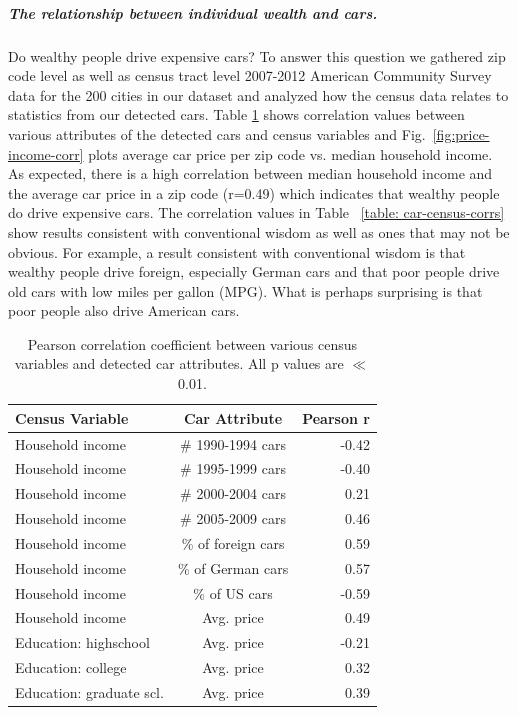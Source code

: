\documentclass[10pt,twocolumn,letterpaper]{article}
\begin{document}
\subparagraph{The relationship between individual wealth and cars.}
Do wealthy people drive expensive cars? To answer this question we gathered zip code level as well as census tract level 2007-2012 American Community Survey data for the 200 cities in our dataset and analyzed how the census data relates to statistics from our detected cars. Table \ref{table:car-census-corrs} shows correlation values between various attributes of the detected cars and  census variables and  Fig.~\ref{fig:price-income-corr} plots average car price per zip code vs. median household income. As expected, there is a high correlation between median household income and the average car price in a zip code (r=0.49) which indicates that wealthy people do drive expensive cars. The correlation values in Table ~\ref{table: car-census-corrs} show results consistent with conventional wisdom as well as ones that may not be obvious. For example, a result consistent with conventional wisdom is that  wealthy people drive foreign, especially German cars and that poor people drive old cars with low miles per gallon (MPG). What is perhaps surprising is that poor people also drive American cars. 

\begin{table}
\begin{center}
\begin{tabular}{|l|c|r|}
\hline
\textbf{Census Variable} & \textbf{Car Attribute} & \textbf{Pearson r}  \\
\hline\hline
Household income & \# 1990-1994 cars & -0.42 \\
Household income & \# 1995-1999 cars & -0.40 \\
Household income & \# 2000-2004 cars & 0.21 \\
Household income & \# 2005-2009 cars & 0.46 \\
Household income & \% of foreign cars & 0.59 \\
Household income & \% of German cars & 0.57 \\
Household income & \% of US cars & -0.59 \\
Household income & Avg. price & 0.49 \\
Education: highschool & Avg. price & -0.21 \\
Education: college & Avg. price & 0.32 \\
Education: graduate scl. & Avg. price & 0.39 \\
\hline
\end{tabular}
\end{center}
\caption{Pearson correlation coefficient between various census variables and detected car attributes. All p values are \(\ll\) 0.01.}
\label{table:car-census-corrs}
\end{table}
\end{document}
